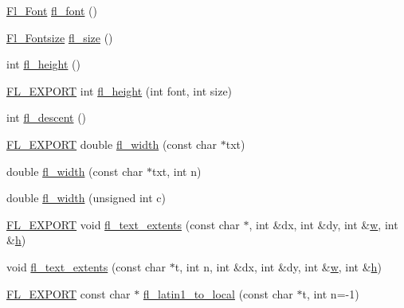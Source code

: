 \begin{DoxyCompactItemize}
\item 
\hyperlink{_enumerations_8_h_a2ac46d9f082834b969fffe490a03a709}{Fl\+\_\+\+Font} \hyperlink{group__fl__attributes_gad234d90fe63191609ec196e1b8041d1a}{fl\+\_\+font} ()
\item 
\hyperlink{_enumerations_8_h_ad58927f5c691454480f7cd28362502f1}{Fl\+\_\+\+Fontsize} \hyperlink{group__fl__attributes_ga15b0cb282ba6d148f095647731f167b2}{fl\+\_\+size} ()
\item 
int \hyperlink{group__fl__attributes_gac4acb828270adf35bf1d8fc06051f938}{fl\+\_\+height} ()
\item 
\hyperlink{_fl___export_8_h_aa9ba29a18aee9d738370a06eeb4470fc}{F\+L\+\_\+\+E\+X\+P\+O\+RT} int \hyperlink{group__fl__attributes_ga287690bb893d1cc57a5010d59b2da8c9}{fl\+\_\+height} (int font, int size)
\item 
int \hyperlink{group__fl__attributes_ga080e029f6b6fe5e6bf527bbfd890317d}{fl\+\_\+descent} ()
\item 
\hyperlink{_fl___export_8_h_aa9ba29a18aee9d738370a06eeb4470fc}{F\+L\+\_\+\+E\+X\+P\+O\+RT} double \hyperlink{group__fl__attributes_ga92c762ce2fc7fa891bac6b7590f967bd}{fl\+\_\+width} (const char $\ast$txt)
\item 
double \hyperlink{group__fl__attributes_gae491dc82c611608435ed434e368ef668}{fl\+\_\+width} (const char $\ast$txt, int n)
\item 
double \hyperlink{group__fl__attributes_ga4a5b5e4a977299acdc7fcbd3c8a700b5}{fl\+\_\+width} (unsigned int c)
\item 
\hyperlink{_fl___export_8_h_aa9ba29a18aee9d738370a06eeb4470fc}{F\+L\+\_\+\+E\+X\+P\+O\+RT} void \hyperlink{group__fl__attributes_ga14cb75a92b6cdd576f9512b38a208f8b}{fl\+\_\+text\+\_\+extents} (const char $\ast$, int \&dx, int \&dy, int \&\hyperlink{forms_8_h_aac374e320caaadeca4874add33b62af2}{w}, int \&\hyperlink{forms_8_h_a7e427ba5b307f9068129699250690066}{h})
\item 
void \hyperlink{group__fl__attributes_gaa52f1ed8201b9d89c2b2edbaed80e907}{fl\+\_\+text\+\_\+extents} (const char $\ast$t, int n, int \&dx, int \&dy, int \&\hyperlink{forms_8_h_aac374e320caaadeca4874add33b62af2}{w}, int \&\hyperlink{forms_8_h_a7e427ba5b307f9068129699250690066}{h})
\item 
\hyperlink{_fl___export_8_h_aa9ba29a18aee9d738370a06eeb4470fc}{F\+L\+\_\+\+E\+X\+P\+O\+RT} const char $\ast$ \hyperlink{group__fl__attributes_ga47015273468749763dcdd97e2aef2c52}{fl\+\_\+latin1\+\_\+to\+\_\+local} (const char $\ast$t, int n=-\/1)
\item 

\end{DoxyCompactItemize}
